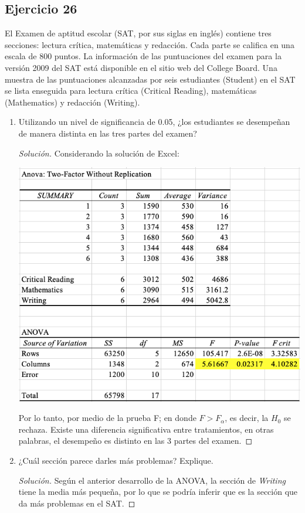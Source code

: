 \documentclass[a4paper,12pt]{article}
\newenvironment{solution}
  {\renewcommand\qedsymbol{$\blacksquare$}\begin{proof}[Solución]}
  {\end{proof}}
\begin{document}
\subsection{Ejercicio 26}
 El Examen de aptitud escolar (SAT, por sus siglas en inglés) contiene tres secciones: lectura crítica, matemáticas y redacción. Cada parte se califica en una escala de 800 puntos. La información de las puntuaciones del examen para la versión 2009 del SAT está disponible en el sitio web del College Board. Una muestra de las puntuaciones alcanzadas por seis estudiantes (Student) en el SAT se lista enseguida para lectura crítica (Critical Reading), matemáticas (Mathematics) y redacción (Writing).
 \begin{enumerate}
     \item Utilizando un nivel de significancia de 0.05, ¿los estudiantes se desempeñan de manera distinta en las tres partes del examen?
    \begin{solution}
Considerando la solución de Excel: 
\begin{center}
    \includegraphics[scale=0.5]{Imagenes/26.png}
\end{center}
Por lo tanto, por medio de la prueba F; en donde $F>F_\alpha$, es decir, la $H_0$ se rechaza. Existe una diferencia significativa entre tratamientos, en otras palabras, el desempeño es distinto en las 3 partes del examen.
    \end{solution}
     \item  ¿Cuál sección parece darles más problemas? Explique.
     \begin{solution}
Según el anterior desarrollo de la ANOVA, la sección de \textit{Writing} tiene la media más pequeña, por lo que se podría inferir que es la sección que da más problemas en el SAT.
\end{solution}
 \end{enumerate}
\end{document}
